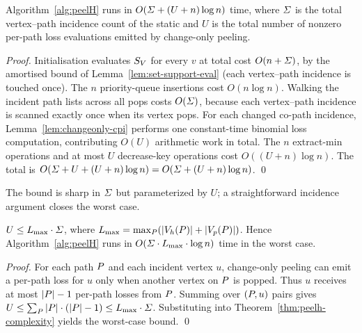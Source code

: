 \begin{theorem}\label{thm:peelh-complexity}
Algorithm~\ref{alg:peelH} runs in $O(\varSigma+(U+n)\log n)$ time, where $\varSigma$ is the total vertex--path incidence count of the static \cpi{} and $U$ is the total number of nonzero per-path loss evaluations emitted by change-only peeling.
\end{theorem}

\begin{proof}
Initialisation evaluates $S_V$ for every $v$ at total cost $O(n+\varSigma)$, by the amortised bound of Lemma~\ref{lem:set-support-eval} (each vertex--path incidence is touched once).
%
The $n$ priority-queue insertions cost $O(n\log n)$.
%
Walking the incident path lists across all pops costs $O(\varSigma)$, because each vertex--path incidence is scanned exactly once when its vertex pops.
%
For each changed co-path incidence, Lemma~\ref{lem:changeonly-cpi} performs one constant-time binomial loss computation, contributing $O(U)$ arithmetic work in total.
%
The $n$ extract-min operations and at most $U$ decrease-key operations cost $O((U+n)\log n)$.
%
The total is $O(\varSigma+U+(U+n)\log n)=O(\varSigma+(U+n)\log n)$.
%
\qed
\end{proof}

The bound is sharp in $\varSigma$ but parameterized by $U$; a straightforward incidence argument closes the worst case.

\begin{corollary}\label{cor:U-bound}
$U\le L_{\max}\cdot\varSigma$, where $L_{\max}=\max_{\TPath}(|\Vh(\TPath)|+|\Vp(\TPath)|)$.
%
Hence Algorithm~\ref{alg:peelH} runs in $O(\varSigma\cdot L_{\max}\cdot\log n)$ time in the worst case.
\end{corollary}

\begin{proof}
For each path $\TPath$ and each incident vertex $u$, change-only peeling can emit a per-path loss for $u$ only when another vertex on $\TPath$ is popped.
%
Thus $u$ receives at most $|\TPath|-1$ per-path losses from $\TPath$.
%
Summing over $(\TPath,u)$ pairs gives $U\le\sum_{\TPath}|\TPath|\cdot(|\TPath|-1)\le L_{\max}\cdot\Sig$.
%
Substituting into Theorem~\ref{thm:peelh-complexity} yields the worst-case bound.
%
\qed
\end{proof}

